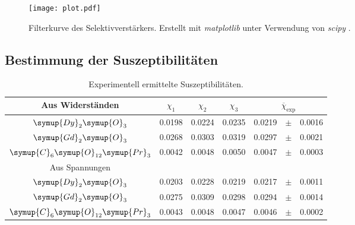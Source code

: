 \begin{figure}
  \centering
  \texttt{[image: plot.pdf]}
  \caption{Filterkurve des Selektivverstärkers. Erstellt mit \textit{matplotlib} \cite{matplotlib} unter Verwendung von \textit{scipy} \cite{scipy}.}
  \label{fig:plot}
\end{figure}

\subsection{Bestimmung der Suszeptibilitäten}
\label{subsec:A_Suszep}

\begin{table}
  \centering
  \caption{Experimentell ermittelte Suszeptibilitäten.}
  \label{tab:Chi_exp}
  \begin{tabular}{c S[table-format = 1.4] S S r c l}
    \toprule
      {Aus Widerständen} & {$\chi_1$} & {$\chi_2$} & {$\chi_3$} &
        \\
    \midrule
      {$\symup{Dy}_2\symup{O}_3$}                 & 0.0198 & 0.0224 & 0.0235 & 0.0219 & {$\pm$} & 0.0016 \\
      {$\symup{Gd}_2\symup{O}_3$}                 & 0.0268 & 0.0303 & 0.0319 & 0.0297 & {$\pm$} & 0.0021 \\
      {$\symup{C}_6\symup{O}_{12}\symup{Pr}_3$}   & 0.0042 & 0.0048 & 0.0050 & 0.0047 & {$\pm$} & 0.0003 \\
    \bottomrule
      {Aus Spannungen} & & & & & \\
    \bottomrule 
      {$\symup{Dy}_2\symup{O}_3$}                 & 0.0203 & 0.0228 & 0.0219 & 0.0217 & {$\pm$} & 0.0011 \\
      {$\symup{Gd}_2\symup{O}_3$}                 & 0.0275 & 0.0309 & 0.0298 & 0.0294 & {$\pm$} & 0.0014 \\
      {$\symup{C}_6\symup{O}_{12}\symup{Pr}_3$}   & 0.0043 & 0.0048 & 0.0047 & 0.0046 & {$\pm$} & 0.0002 \\
    \bottomrule 
  \end{tabular}
\end{table}

